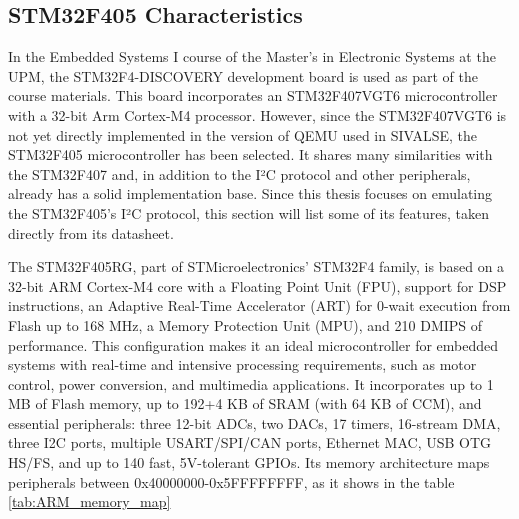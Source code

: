 \subsection{STM32F405 Characteristics}
\label{chap:Back_ARM_STM32F4xx}

In the Embedded Systems I course of the Master's in Electronic Systems at 
the UPM, the STM32F4-DISCOVERY development board is used as part of the 
course materials. This board incorporates an STM32F407VGT6 microcontroller 
with a 32-bit Arm Cortex-M4 processor. However, since the STM32F407VGT6 
is not yet directly implemented in the version of QEMU used in SIVALSE, the 
STM32F405 microcontroller has been selected. It shares many similarities with 
the STM32F407\cite{STM32F405Datasheet2026}\cite{STM32CortexM42026} and, in addition to the I²C protocol and other peripherals, 
already has a solid implementation base. Since this thesis focuses on emulating the 
STM32F405's I²C protocol, this section will list some of its features, taken directly 
from its datasheet.

The STM32F405RG, part of STMicroelectronics' STM32F4 family, is based on 
a 32-bit ARM Cortex-M4 core with a Floating Point Unit (FPU), support for DSP 
instructions, an Adaptive Real-Time Accelerator (ART) for 0-wait execution from 
Flash up to 168 MHz, a Memory Protection Unit (MPU), and 210 DMIPS of 
performance. This configuration makes it an ideal microcontroller for embedded 
systems with real-time and intensive processing requirements, such as motor 
control, power conversion, and multimedia applications. It incorporates up to 1 MB 
of Flash memory, up to 192+4 KB of SRAM (with 64 KB of CCM), and essential 
peripherals: three 12-bit ADCs, two DACs, 17 timers, 16-stream DMA, three I2C ports, 
multiple USART/SPI/CAN ports, Ethernet MAC, USB OTG HS/FS, and up to 
140 fast, 5V-tolerant GPIOs. Its memory architecture maps peripherals between 
0x40000000-0x5FFFFFFFF, as it shows in the table \ref{tab:ARM_memory_map}

\begin{table} [H]
    \centering
    \caption
        {
            STM32F405 Memory Map
        }
    \label{tab:ARM_memory_map}
\end{table}


